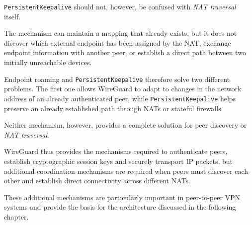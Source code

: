 \texttt{PersistentKeepalive} should not, however, be confused with \textit{NAT traversal} itself.

The mechanism can maintain a mapping that already exists, but it does not discover which external endpoint has been assigned by the NAT, exchange endpoint information with another peer, or establish a direct path between two initially unreachable devices.

Endpoint roaming and \texttt{PersistentKeepalive} therefore solve two different problems. The first one allows WireGuard to adapt to changes in the network address of an already authenticated peer, while \texttt{PersistentKeepalive} helps preserve an already established path through NATs or stateful firewalls.

Neither mechanism, however, provides a complete solution for peer discovery or \textit{NAT traversal}.

WireGuard thus provides the mechanisms required to authenticate peers, establish cryptographic session keys and securely transport IP packets, but additional coordination mechanisms are required when peers must discover each other and establish direct connectivity across different NATs.

These additional mechanisms are particularly important in peer-to-peer VPN systems and provide the basis for the architecture discussed in the following chapter.